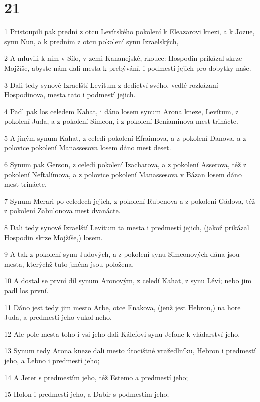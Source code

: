 \chapter{21}

\par 1 Pristoupili pak prední z otcu Levítského pokolení k Eleazarovi knezi, a k Jozue, synu Nun, a k predním z otcu pokolení synu Izraelských,
\par 2 A mluvili k nim v Sílo, v zemi Kananejské, rkouce: Hospodin prikázal skrze Mojžíše, abyste nám dali mesta k prebývání, i podmestí jejich pro dobytky naše.
\par 3 Dali tedy synové Izraelští Levítum z dedictví svého, vedlé rozkázaní Hospodinova, mesta tato i podmestí jejich.
\par 4 Padl pak los celedem Kahat, i dáno losem synum Arona kneze, Levítum, z pokolení Juda, a z pokolení Simeon, i z pokolení Beniaminova mest trinácte.
\par 5 A jiným synum Kahat, z celedí pokolení Efraimova, a z pokolení Danova, a z polovice pokolení Manassesova losem dáno mest deset.
\par 6 Synum pak Gerson, z celedí pokolení Izacharova, a z pokolení Asserova, též z pokolení Neftalímova, a z polovice pokolení Manassesova v Bázan losem dáno mest trinácte.
\par 7 Synum Merari po celedech jejich, z pokolení Rubenova a z pokolení Gádova, též z pokolení Zabulonova mest dvanácte.
\par 8 Dali tedy synové Izraelští Levítum ta mesta i predmestí jejich, (jakož prikázal Hospodin skrze Mojžíše,) losem.
\par 9 A tak z pokolení synu Judových, a z pokolení synu Simeonových dána jsou mesta, kterýchž tuto jména jsou položena.
\par 10 A dostal se první díl synum Aronovým, z celedí Kahat, z synu Léví; nebo jim padl los první.
\par 11 Dáno jest tedy jim mesto Arbe, otce Enakova, (jenž jest Hebron,) na hore Juda, a predmestí jeho vukol neho.
\par 12 Ale pole mesta toho i vsi jeho dali Kálefovi synu Jefone k vládarství jeho.
\par 13 Synum tedy Arona kneze dali mesto útocištné vražedlníku, Hebron i predmestí jeho, a Lebno i predmestí jeho;
\par 14 A Jeter s predmestím jeho, též Estemo a predmestí jeho;
\par 15 Holon i predmestí jeho, a Dabir s podmestím jeho;
